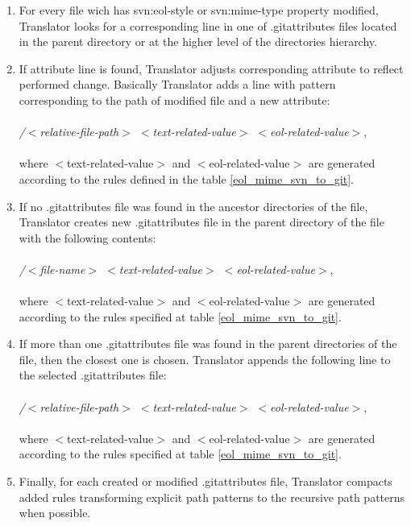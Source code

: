 \begin{enumerate}
\compactlist
\item For every file wich has svn:eol-style or svn:mime-type property modified, Translator looks for a corresponding line in one of .gitattributes files located in the parent directory or 
at the higher level of the directories hierarchy.\\
	
\item If attribute line is found, Translator adjusts corresponding attribute to reflect performed change. Basically Translator adds a line with pattern corresponding to the path of modified file and a new attribute:\\\\
\emph{/$<$relative-file-path$>$ $<$text-related-value$>$ $<$eol-related-value$>$},\\\\
where $<$text-related-value$>$ and $<$eol-related-value$>$ are generated according to the rules defined in the table \ref{eol_mime_svn_to_git}.\\
	
\item If no .gitattributes file was found in the ancestor directories of the file, Translator creates new .gitattributes file in the parent directory of the file with the following contents:\\\\
\emph{/$<$file-name$>$ $<$text-related-value$>$ $<$eol-related-value$>$},\\\\
where $<$text-related-value$>$ and $<$eol-related-value$>$ are generated according to the rules specified at table \ref{eol_mime_svn_to_git}.\\
	
\item If more than one .gitattributes file was found in the parent directories of the file, then the closest one is chosen. 
Translator appends the following line to the selected .gitattributes file:\\\\
\emph{/$<$relative-file-path$>$ $<$text-related-value$>$ $<$eol-related-value$>$},\\\\
where $<$text-related-value$>$ and $<$eol-related-value$>$ are generated according to the rules specified at table \ref{eol_mime_svn_to_git}.\\
\item Finally, for each created or modified .gitattributes file, Translator compacts added rules transforming 
explicit path patterns to the recursive path patterns when possible.
\end{enumerate}

